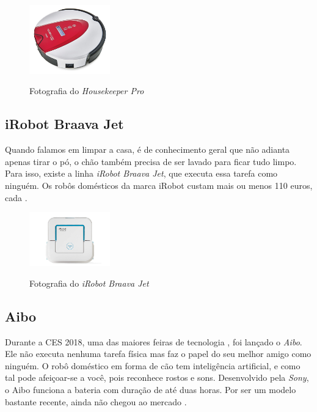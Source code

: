 \documentclass[10pt]{article}
\begin{document}
\begin{figure}[h]
\caption{Fotografia do \textit{Housekeeper Pro}}
\centering
\includegraphics[width = 3.5cm]{img/7.2.jpg}
\label{figura:7.2}
\end{figure}

\subsection{iRobot Braava Jet}

\hspace{\parindent}Quando falamos em limpar a casa, é de conhecimento geral que não adianta apenas tirar o pó, o chão também precisa de ser lavado para ficar tudo limpo. Para isso, existe a linha \textit{iRobot Braava Jet}, que executa essa tarefa como ninguém. Os robôs domésticos da marca iRobot custam mais ou menos 110 euros, cada \cite{examples}.

\begin{figure}[h]
\caption{Fotografia do \textit{iRobot Braava Jet}}
\centering
\includegraphics[width = 3.5cm]{img/7.3.jpg}
\label{figura:7.3}
\end{figure}

\subsection{Aibo}

\hspace{\parindent}Durante a CES 2018, uma das maiores feiras de tecnologia \cite{ces}, foi lançado o \textit{Aibo}. Ele não executa nenhuma tarefa física mas faz o papel do seu melhor amigo como ninguém. O robô doméstico em forma de cão tem inteligência artificial, e como tal pode afeiçoar-se a você, pois reconhece rostos e sons. Desenvolvido pela \textit{Sony}, o Aibo funciona a bateria com duração de até duas horas. Por ser um modelo bastante recente, ainda não chegou ao mercado \cite{examples}.
\end{document}
